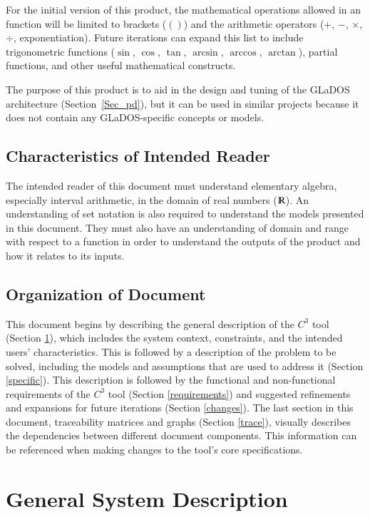 \documentclass[12pt]{article}
\newcommand{\prognameAbbrv}{$C^{3}$}
\begin{document}
For the initial version of this product, the mathematical operations allowed in 
an function will be limited to brackets ($()$) and the arithmetic operators 
($+$, $-$, $\times$, $\div$, exponentiation). Future iterations can expand this 
list to include trigonometric functions ($\sin$, $\cos$, $\tan$, $\arcsin$,
$\arccos$, $\arctan$), partial functions, and other useful mathematical 
constructs.

The purpose of this product is to aid in the design and tuning of the GLaDOS 
architecture (Section~\ref{Sec_pd}), but it can be used in similar projects 
because it does not contain any GLaDOS-specific concepts or models.

\subsection{Characteristics of Intended Reader}
\label{intro_reader}
The intended reader of this document must understand elementary algebra, 
especially interval arithmetic, in the domain of real numbers 
($\varmathbb{R}$). An understanding of set notation is also required to 
understand the models presented in this document. They must also have an 
understanding of domain and range with respect to a function in order to 
understand the outputs of the product 
and how it relates to its inputs.

\subsection{Organization of Document}
This document begins by describing the general description of the 
\prognameAbbrv{} tool (Section \ref{general}), which includes the system 
context, constraints, and the intended users' characteristics. This is followed 
by a description of the problem to be solved, including the models and 
assumptions that are used to address it (Section \ref{specific}). This 
description is followed by the functional and non-functional requirements of 
the \prognameAbbrv{} tool (Section \ref{requirements}) and suggested 
refinements and expansions for future iterations (Section \ref{changes}). The 
last section in this document, traceability matrices and graphs (Section 
\ref{trace}), visually describes the dependencies between different document 
components. This information can be referenced when making changes to the 
tool's core specifications.

\section{General System Description}
\label{general}
\end{document}
